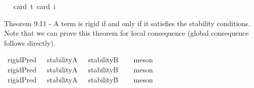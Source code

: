 \begin{isabellebody}
\ \ \isamarkupfalse%
{\isacharbrackleft}card\ {\isacharprime}t{\isacharequal}{}{\isacharcomma}\ card\ i{\isacharequal}{}{\isacharbrackright}%
\isadelimproof
\ %
\endisadelimproof
%
\isatagproof
{}\isamarkupfalse%
\ %
%
\endisatagproof
{\isafoldproof}%
%
\isadelimproof
%
\endisadelimproof
%
\begin{isamarkuptext}%
Theorem 9.11 - A term is rigid if and only if it satisfies the stability conditions. Note that
 we can prove this theorem for local consequence (global consequence follows directly).%
\end{isamarkuptext}\isamarkuptrue%
\isamarkupfalse%
\ {\isachardoublequoteopen}{\isasymlfloor}rigidPred\ {\isacharparenleft}{\isasymtau}{\isacharcolon}{\isacharcolon}{\isasymup}{\isasymlangle}{\isasymzero}{\isasymrangle}{\isacharparenright}\ \isactrlbold {\isasymleftrightarrow}\ {\isacharparenleft}stabilityA\ {\isasymtau}\ \isactrlbold {\isasymand}\ stabilityB\ {\isasymtau}{\isacharparenright}{\isasymrfloor}{\isachardoublequoteclose}%
\isadelimproof
\ %
\endisadelimproof
%
\isatagproof
{}\isamarkupfalse%
\ meson%
\endisatagproof
{\isafoldproof}%
%
\isadelimproof
%
\endisadelimproof
\ \ \ \isanewline
{}\isamarkupfalse%
\ {\isachardoublequoteopen}{\isasymlfloor}rigidPred\ {\isacharparenleft}{\isasymtau}{\isacharcolon}{\isacharcolon}{\isasymup}{\isasymlangle}{\isasymup}{\isasymzero}{\isasymrangle}{\isacharparenright}\ \isactrlbold {\isasymleftrightarrow}\ {\isacharparenleft}stabilityA\ {\isasymtau}\ \isactrlbold {\isasymand}\ stabilityB\ {\isasymtau}{\isacharparenright}{\isasymrfloor}{\isachardoublequoteclose}%
\isadelimproof
\ %
\endisadelimproof
%
\isatagproof
{}\isamarkupfalse%
\ meson%
\endisatagproof
{\isafoldproof}%
%
\isadelimproof
%
\endisadelimproof
\ \ \ \isanewline
{}\isamarkupfalse%
\ {\isachardoublequoteopen}{\isasymlfloor}rigidPred\ {\isacharparenleft}{\isasymtau}{\isacharcolon}{\isacharcolon}{\isasymup}{\isasymlangle}{\isasymup}{\isasymlangle}{\isasymzero}{\isasymrangle}{\isasymrangle}{\isacharparenright}\ \isactrlbold {\isasymleftrightarrow}\ {\isacharparenleft}stabilityA\ {\isasymtau}\ \isactrlbold {\isasymand}\ stabilityB\ {\isasymtau}{\isacharparenright}{\isasymrfloor}{\isachardoublequoteclose}%
\isadelimproof
\ %
\endisadelimproof
%
\isatagproof
{}\isamarkupfalse%
\ meson%
\endisatagproof
{\isafoldproof}%
%
\isadelimproof
%
\endisadelimproof
%
\begin{isamarkuptext}%
\pagebreak%
\end{isamarkuptext}\isamarkuptrue%
%
\isadelimtheory
%
\endisadelimtheory
%
\isatagtheory
%
\endisatagtheory
{\isafoldtheory}%
%
\isadelimtheory
%
\endisadelimtheory
%
\end{isabellebody}%
